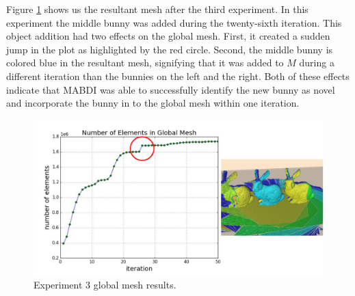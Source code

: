 Figure \ref{fig:gm_3} shows us the resultant mesh after the third experiment. In
this experiment the middle bunny was added during the twenty-sixth iteration.
This object addition had two effects on the global mesh. First, it created a
sudden jump in the plot as highlighted by the red circle. Second, the middle
bunny is colored blue in the resultant mesh, signifying that it was added to $M$
during a different iteration than the bunnies on the left and the right. Both of
these effects indicate that MABDI was able to successfully identify the new
bunny as novel and incorporate the bunny in to the global mesh within one
iteration.

\begin{figure}[h]%
\centering
  \includegraphics[width=\textwidth]{figures/diagram_run3_gm.pdf}
  \caption{Experiment 3 global mesh results.}
  \label{fig:gm_3}
\end{figure}

